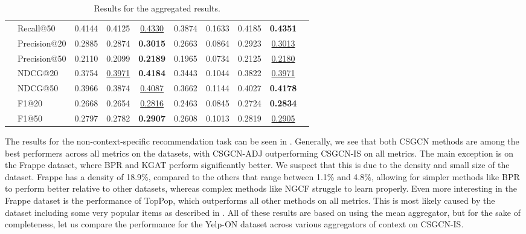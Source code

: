 \begin{table*}[]
{\begin{tabular}{@{}l|l|cccccc|cc@{}}
                        & Recall@50    & 0.4144       & 0.4125       & {\ul {0.4330}}    & 0.3874 & 0.1633          & 0.4185 & \textbf{0.4351} &  \\
                        & Precision@20 & 0.2885       & 0.2874       & \textbf{0.3015} & 0.2663 & 0.0864          & 0.2923 & {\ul {0.3013}}    &  \\
                        & Precision@50 & 0.2110       & 0.2099       & \textbf{0.2189} & 0.1965 & 0.0734          & 0.2125 & {\ul {0.2180}}    &  \\
                        & NDCG@20      & 0.3754       & {\ul{ 0.3971}} & \textbf{0.4184} & 0.3443 & 0.1044          & 0.3822 & {\ul {0.3971}}    &  \\
                        & NDCG@50      & 0.3966       & 0.3874       & {\ul {0.4087}}    & 0.3662 & 0.1144          & 0.4027 & \textbf{0.4178} &  \\
                        & F1@20        & 0.2668       & 0.2654       & {\ul{0.2816}}    & 0.2463 & 0.0845          & 0.2724 & \textbf{0.2834} &  \\
                        & F1@50        & 0.2797       & 0.2782       & \textbf{0.2907} & 0.2608 & 0.1013          & 0.2819 & {\ul{0.2905}}    &  \\ \bottomrule
\end{tabular}%
}
\caption{Results for the aggregated results.}
\label{tab:aggregatedresults}
\end{table*}
The results for the non-context-specific recommendation task can be seen in .
Generally, we see that both CSGCN methods are among the best performers across all metrics on the datasets, with CSGCN-ADJ outperforming CSGCN-IS on all metrics.
The main exception is on the Frappe dataset, where BPR and KGAT perform significantly better.
We suspect that this is due to the density and small size of the dataset.
Frappe has a density of 18.9\%, compared to the others that range between 1.1\% and 4.8\%, allowing for simpler methods like BPR to perform better relative to other datasets, whereas complex methods like NGCF struggle to learn properly.
Even more interesting in the Frappe dataset is the performance of TopPop, which outperforms all other methods on all metrics.
This is most likely caused by the dataset including some very popular items as described in .
All of these results are based on using the mean aggregator, but for the sake of completeness, let us compare the performance for the Yelp-ON dataset across various aggregators of context on CSGCN-IS.

